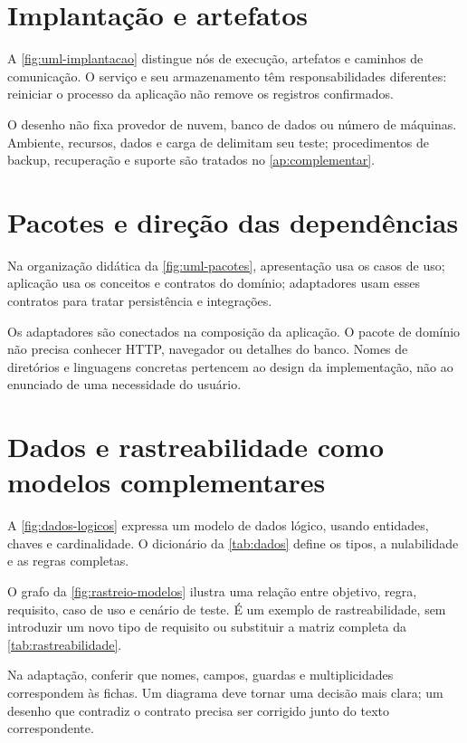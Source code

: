 \clearpage
\section{Implantação e artefatos}
A \autoref{fig:uml-implantacao} distingue nós de execução, artefatos e caminhos
de comunicação. O serviço e seu armazenamento têm responsabilidades diferentes:
reiniciar o processo da aplicação não remove os registros confirmados.

  {}

O desenho não fixa provedor de nuvem, banco de dados ou número de máquinas.
Ambiente, recursos, dados e carga de  delimitam seu teste;
procedimentos de backup, recuperação e suporte são tratados no
\autoref{ap:complementar}.

\clearpage
\section{Pacotes e direção das dependências}
Na organização didática da \autoref{fig:uml-pacotes}, apresentação usa os casos
de uso; aplicação usa os conceitos e contratos do domínio; adaptadores usam
esses contratos para tratar persistência e integrações.

  {}

Os adaptadores são conectados na composição da aplicação. O pacote de domínio
não precisa conhecer HTTP, navegador ou detalhes do banco. Nomes de diretórios
e linguagens concretas pertencem ao design da implementação, não ao enunciado
de uma necessidade do usuário.

\section{Dados e rastreabilidade como modelos complementares}
A \autoref{fig:dados-logicos} expressa um modelo de dados lógico, usando
entidades, chaves e cardinalidade. O dicionário da \autoref{tab:dados} define
os tipos, a nulabilidade e as regras completas.

  {}

\clearpage
O grafo da \autoref{fig:rastreio-modelos} ilustra uma relação entre objetivo,
regra, requisito, caso de uso e cenário de teste. É um exemplo de rastreabilidade,
sem introduzir um novo tipo de requisito ou substituir a matriz completa da
\autoref{tab:rastreabilidade}.

  {}

Na adaptação, conferir que nomes, campos, guardas e multiplicidades correspondem
às fichas. Um diagrama deve tornar uma decisão mais clara; um desenho que
contradiz o contrato precisa ser corrigido junto do texto correspondente.
